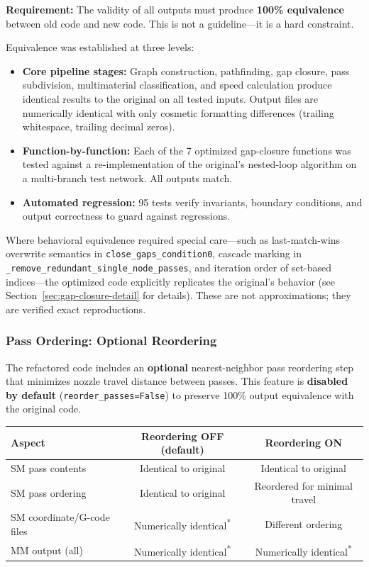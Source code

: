 \documentclass[11pt,a4paper]{article}
\begin{document}
\textbf{Requirement:} The validity of all outputs must produce \textbf{100\% equivalence} between old code and new code. This is not a guideline---it is a hard constraint.

Equivalence was established at three levels:

\begin{itemize}[leftmargin=2em]
    \item \textbf{Core pipeline stages:} Graph construction, pathfinding, gap closure, pass subdivision, multimaterial classification, and speed calculation produce identical results to the original on all tested inputs. Output files are numerically identical with only cosmetic formatting differences (trailing whitespace, trailing decimal zeros).
    \item \textbf{Function-by-function:} Each of the 7 optimized gap-closure functions was tested against a re-implementation of the original's nested-loop algorithm on a multi-branch test network. All outputs match.
    \item \textbf{Automated regression:} 95 tests verify invariants, boundary conditions, and output correctness to guard against regressions.
\end{itemize}

Where behavioral equivalence required special care---such as last-match-wins overwrite semantics in \texttt{close\_gaps\_condition0}, cascade marking in \texttt{\_remove\_redundant\_single\_node\_passes}, and iteration order of set-based indices---the optimized code explicitly replicates the original's behavior (see Section~\ref{sec:gap-closure-detail} for details). These are not approximations; they are verified exact reproductions.

\subsubsection{Pass Ordering: Optional Reordering}
\label{sec:equivalence-note}

The refactored code includes an \textbf{optional} nearest-neighbor pass reordering step that minimizes nozzle travel distance between passes. This feature is \textbf{disabled by default} (\texttt{reorder\_passes=False}) to preserve 100\% output equivalence with the original code.

\begin{center}
\begin{tabular}{lcc}
\toprule
\textbf{Aspect} & \textbf{Reordering OFF (default)} & \textbf{Reordering ON} \\
\midrule
SM pass contents & Identical to original & Identical to original \\
SM pass ordering & Identical to original & Reordered for minimal travel \\
SM coordinate/G-code files & Numerically identical\textsuperscript{*} & Different ordering \\
MM output (all) & Numerically identical\textsuperscript{*} & Numerically identical\textsuperscript{*} \\
\bottomrule
\end{tabular}
\end{center}
\end{document}
